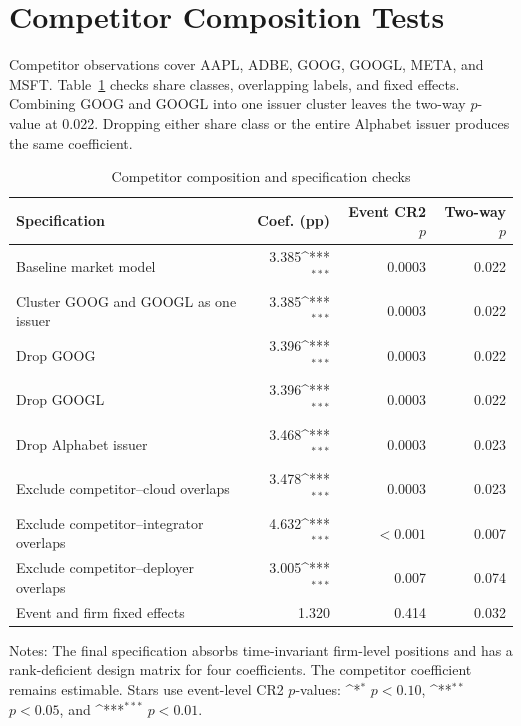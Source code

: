 \documentclass[12pt]{article}
\newcommand{\sym}[1]{\ifmmode^{#1}\else\(^{#1}\)\fi}
\begin{document}
\section{Competitor Composition Tests}

Competitor observations cover AAPL, ADBE, GOOG, GOOGL, META, and MSFT.
Table~\ref{tab:a6} checks share classes, overlapping labels, and fixed
effects. Combining GOOG and GOOGL into one issuer cluster leaves the
two-way $p$-value at 0.022. Dropping either share class or the entire
Alphabet issuer produces the same coefficient.

\begin{table}[H]
\centering
\begin{threeparttable}
\caption{Competitor composition and specification checks}\label{tab:a6}
\scriptsize
\setlength{\tabcolsep}{3.4pt}
\begin{tabular}{lrrr}
\toprule
Specification & Coef. (pp) & Event CR2 $p$ & Two-way $p$ \\
\midrule
Baseline market model                    & 3.385\sym{***} & 0.0003 & 0.022 \\
Cluster GOOG and GOOGL as one issuer     & 3.385\sym{***} & 0.0003 & 0.022 \\
Drop GOOG                                & 3.396\sym{***} & 0.0003 & 0.022 \\
Drop GOOGL                               & 3.396\sym{***} & 0.0003 & 0.022 \\
Drop Alphabet issuer                     & 3.468\sym{***} & 0.0003 & 0.023 \\
Exclude competitor--cloud overlaps       & 3.478\sym{***} & 0.0003 & 0.023 \\
Exclude competitor--integrator overlaps  & 4.632\sym{***} & $<0.001$ & 0.007 \\
Exclude competitor--deployer overlaps    & 3.005\sym{***} & 0.007 & 0.074 \\
Event and firm fixed effects             & 1.320 & 0.414 & 0.032 \\
\bottomrule
\end{tabular}
\begin{tablenotes}\footnotesize
\item Notes: The final specification absorbs time-invariant firm-level
positions and has a rank-deficient design matrix for four coefficients.
The competitor coefficient remains estimable.
Stars use event-level CR2 $p$-values:
\sym{*} $p<0.10$, \sym{**} $p<0.05$, and \sym{***} $p<0.01$.
\end{tablenotes}
\end{threeparttable}
\end{table}
\end{document}
